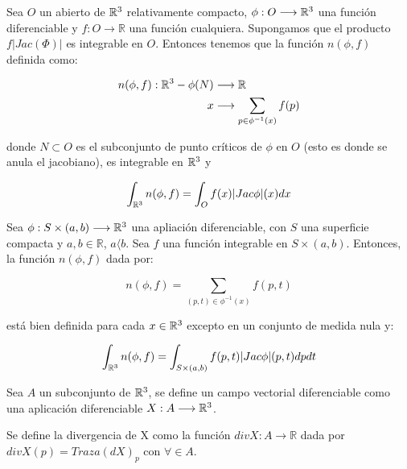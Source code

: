 \begin{theorem}
Sea $O$ un abierto de $\mathbb{R}^3$ relativamente compacto, $\phi: O \longrightarrow \mathbb{R}^3$ una función diferenciable y $f: O \longrightarrow \mathbb{R}$ una función cualquiera. Supongamos que el producto $f|Jac(\Phi)|$ es integrable en $O$. Entonces tenemos que la función $n(\phi, f)$ definida como:

\begin{align*}
    n(\phi, f): \mathbb{R}^3 - \phi(N) &\longrightarrow \mathbb{R} \\
    x &\longrightarrow \sum_{p \in \phi^{-1}(x)} f(p)
\end{align*}

donde $N \subset O$ es el subconjunto de punto críticos de $\phi$ en $O$ (esto es donde se anula el jacobiano), es integrable en $\mathbb{R}^3$ y 

\begin{equation*}
    \int_{\mathbb{R}^3} n(\phi, f) = \int_O f(x)|Jac \phi|(x)dx
\end{equation*}
\end{theorem}

\begin{theorem}
Sea $\phi: S \times (a,b) \longrightarrow \mathbb{R}^3$ una apliación diferenciable, con $S$ una superficie compacta y $a,b \in \mathbb{R}$, $a  \langle  b$. Sea $f$ una función integrable en $S \times (a,b)$. Entonces, la función $n(\phi, f)$ dada por:

\begin{equation*}
    n(\phi, f) = \sum_{(p,t) \in \phi^{-1}(x)} f(p,t)
\end{equation*}

está bien definida para cada $x \in \mathbb{R}^3$ excepto en un conjunto de medida nula y:

\begin{equation*}
    \int_{\mathbb{R}^3} n(\phi, f) = \int_{S \times (a,b)} f(p,t)|Jac \phi|(p,t)dpdt
\end{equation*}
\end{theorem}

\begin{definition}
Sea $A$ un subconjunto de $\mathbb{R}^3$, se define un campo vectorial diferenciable como una aplicación diferenciable $X: A \longrightarrow \mathbb{R}^3$.
\end{definition}

\begin{definition}
Se define la divergencia de X como la función $div X: A \longrightarrow \mathbb{R}$ dada por $divX(p) = Traza(dX)_p$ con $\forall \in A$.
\end{definition}

